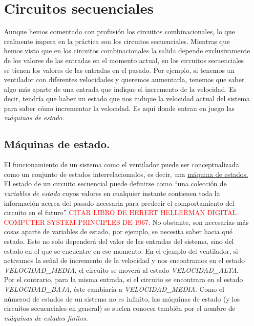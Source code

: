 \chapter{Circuitos secuenciales}

Aunque hemos comentado con profusión los circuitos combinacionales, lo que realmente impera en la práctica son los circuitos secuenciales. Mientras que hemos visto que en los circuitos combinacionales la salida depende exclusivamente de los valores de las entradas en el momento actual, en los circuitos secuenciales se tienen los valores de las entradas en el pasado. Por ejemplo, si tenemos un ventilador con diferentes velocidades y queremos aumentarla, tenemos que saber algo más aparte de una entrada que indique el incremento de la velocidad. Es decir, tendría que haber un estado que nos indique la velocidad actual del sistema para saber cómo incrementar la velocidad. Es aquí donde entran en juego las \emph{máquinas de estado.}

\section{Máquinas de estado.}

El funcionamiento de un sistema como el ventilador puede ser conceptualizada como un conjunto de estados interrelacionados, es decir, una \hyperlink{state-machine}{máquina de estados.} El estado de un circuito secuencial puede definirse como ``una colección de \emph{variables de estado} cuyos valores en cualquier instante contienen toda la información acerca del pasado necesaria para predecir el comportamiento del circuito en el futuro'' \textcolor{red}{CITAR LIBRO DE HERERT HELLERMAN DIGITAL COMPUTER SYSTEM PRINCIPLES DE 1967}. No obstante, son necesarias más cosas aparte de variables de estado, por ejemplo, se necesita saber hacia qué estado. Este no solo dependerá del valor de las entradas del sistema, sino del estado en el que se encuentre en ese momento. En el ejemplo del ventilador, si activamos la señal de incremento de la velocidad y nos encontramos en el estado \emph{VELOCIDAD\_MEDIA}, el circuito se moverá al estado \emph{VELOCIDAD\_ALTA}. Por el contrario, para la misma entrada, si el circuito se encontrara en el estado \emph{VELOCIDAD\_BAJA}, éste cambiaría a \emph{VELOCIDAD\_MEDIA}. Como el númerod de estados de un sistema no es infinito, las máquinas de estado (y los circuitos secuenciales en general) se suelen conocer también por el nombre de \emph{máquinas de estados finitos.}

